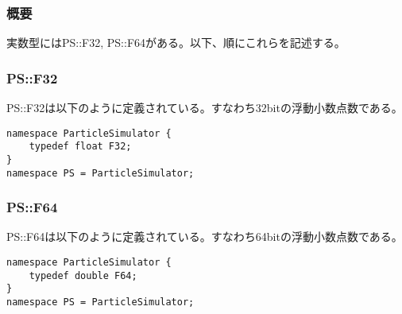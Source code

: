 \subsubsection{概要}

実数型にはPS::F32, PS::F64がある。以下、順にこれらを記述する。

\subsubsection{PS::F32}

PS::F32は以下のように定義されている。すなわち32bitの浮動小数点数である。
\begin{lstlisting}[caption=F32]
namespace ParticleSimulator {
    typedef float F32;
}
namespace PS = ParticleSimulator;
\end{lstlisting}

\subsubsection{PS::F64}

PS::F64は以下のように定義されている。すなわち64bitの浮動小数点数である。
\begin{lstlisting}[caption=F64]
namespace ParticleSimulator {
    typedef double F64;
}
namespace PS = ParticleSimulator;
\end{lstlisting}
